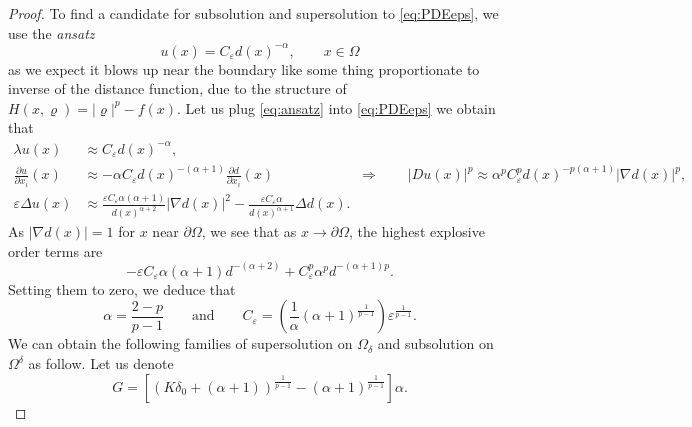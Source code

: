 \documentclass[11pt,reqno]{amsart}
\numberwithin{figure}{section}
\theoremstyle{plain}
\theoremstyle{remark}
\numberwithin{equation}{section}
\begin{document}
\begin{proof}
\noindent To find a candidate for subsolution and supersolution to \eqref{eq:PDEeps}, we use the \emph{ansatz}
\begin{equation}\label{eq:ansatz}
    u(x) = C_\varepsilon d(x)^{-\alpha}, \qquad x\in \Omega
\end{equation}
as we expect it blows up near the boundary like some thing proportionate to inverse of the distance function, due to the structure of $H(x,\varrho) = |\varrho|^p - f(x)$. Let us plug \eqref{eq:ansatz} into \eqref{eq:PDEeps} we obtain that 
\begin{align*}
    \lambda u(x) &\approx C_\varepsilon d(x)^{-\alpha},\\
    \frac{\partial u}{\partial x_i}(x) &\approx -\alpha C_\varepsilon d(x)^{-(\alpha+1)} \frac{\partial d}{\partial x_i}(x) \qquad\qquad\qquad \Longrightarrow\qquad |Du (x)|^p \approx \alpha^p C_\varepsilon^p d(x)^{-p(\alpha+1)}|\nabla d(x)|^p,\\
    \varepsilon\Delta u(x) &\approx \frac{\varepsilon C_\varepsilon\alpha(\alpha+1)}{d(x)^{\alpha+2}}|\nabla d(x)|^2 - \frac{\varepsilon C_\varepsilon\alpha}{d(x)^{\alpha+1}}\Delta d(x).
\end{align*}
As $|\nabla d(x)| = 1$ for $x$ near $\partial\Omega$, we see that as $x\to \partial \Omega$, the highest explosive order terms are
\begin{equation*}
        -\varepsilon C_\varepsilon \alpha(\alpha+1)d^{-(\alpha+2)} + C_\varepsilon^p \alpha^p d^{-(\alpha+1)p}.
\end{equation*}
Setting them to zero, we deduce that
\begin{equation*}
    \displaystyle\alpha = \frac{2-p}{p-1} \qquad\text{and}\qquad C_\varepsilon = \left(\frac{1}{\alpha}(\alpha+1)^\frac{1}{p-1}\right) \varepsilon^{\frac{1}{p-1}}.
\end{equation*}
We can obtain the following families of supersolution on $\Omega_\delta$ and subsolution on $\Omega^\delta$ as follow. Let us denote
\begin{equation*}
    G = \left[\left(K\delta_0+(\alpha+1)\right)^\frac{1}{p-1} - (\alpha+1)^{\frac{1}{p-1}}\right]\alpha.
\end{equation*}


\end{proof}
\end{document}
